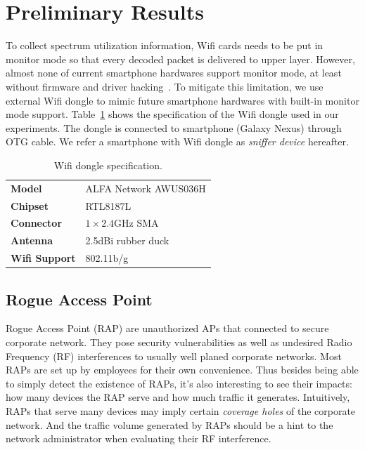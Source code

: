 \section{Preliminary Results}
\label{sec-results}

To collect spectrum utilization information, Wifi cards needs to be put in
monitor mode so that every decoded packet is delivered to upper layer.  However,
almost none of current smartphone hardwares support monitor mode, at
least without firmware and driver hacking~\cite{bcmon}. To mitigate this
limitation, we use external Wifi dongle to mimic future smartphone hardwares
with built-in monitor mode support. Table~\ref{tab:dongle} shows the
specification of the Wifi dongle used in our experiments. The dongle is
connected to smartphone (Galaxy Nexus) through OTG cable. We refer a smartphone
with Wifi dongle as \textit{sniffer device} hereafter.

\begin{table}[t!]
  \centering
  \begin{tabular}{ll}
    \toprule
    \textbf{Model} & ALFA Network AWUS036H \\
    \textbf{Chipset} & RTL8187L \\
    \textbf{Connector} & $1\times2.4$GHz SMA \\
    \textbf{Antenna} & 2.5dBi rubber duck \\
    \textbf{Wifi Support} & 802.11b/g \\
    \bottomrule
  \end{tabular}
  \caption{Wifi dongle specification.}
  \label{tab:dongle}
\end{table}


\subsection{Rogue Access Point}

Rogue Access Point (RAP) are unauthorized APs that connected to secure corporate
network. They pose security vulnerabilities as well as undesired Radio Frequency
(RF) interferences to usually well planed corporate networks. Most RAPs are set
up by employees for their own convenience. Thus besides being able to simply
detect the existence of RAPs, it's also interesting to see their impacts: how
many devices the RAP serve and how much traffic it generates. Intuitively, RAPs 
that serve many devices may imply certain \textit{coverage holes} of the
corporate network. And the traffic volume generated by RAPs should be a hint to
the network administrator when evaluating their RF interference.

